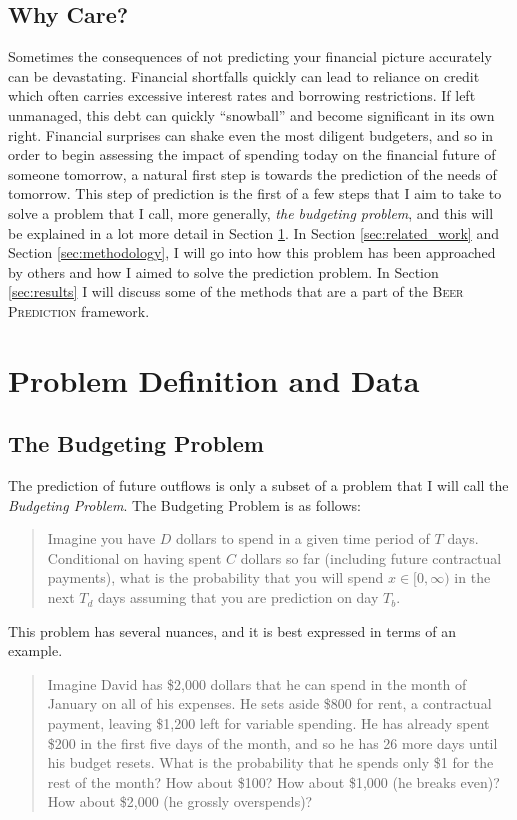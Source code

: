 \documentclass[11pt,a4paper]{article}
\newcommand{\beer}{\textsc{Beer Prediction}\xspace}
\begin{document}
\subsection{Why Care?}

Sometimes the consequences of not predicting your financial picture accurately can be devastating. Financial shortfalls quickly can lead to reliance on credit which often carries excessive interest rates and borrowing restrictions. If left unmanaged, this debt can quickly ``snowball'' and become significant in its own right. Financial surprises can shake even the most diligent budgeters, and so in order to begin assessing the impact of spending today on the financial future of someone tomorrow, a natural first step is towards the prediction of the needs of tomorrow. This step of prediction is the first of a few steps that I aim to take to solve a problem that I call, more generally, \textit{the budgeting problem}, and this will be explained in a lot more detail in Section \ref{sec:problem}. In Section \ref{sec:related_work} and Section \ref{sec:methodology}, I will go into how this problem has been approached by others and how I aimed to solve the prediction problem. In Section \ref{sec:results} I will discuss some of the methods that are a part of the \beer framework. 

\section{Problem Definition and Data} \label{sec:problem}

\subsection{The Budgeting Problem}
The prediction of future outflows is only a subset of a problem that I will call the \textit{Budgeting Problem}. The Budgeting Problem is as follows:
\begin{quote}
	Imagine you have $D$ dollars to spend in a given time period of $T$ days. Conditional on having spent $C$ dollars so far (including future contractual payments), what is the probability that you will spend $x \in [0,\infty)$ in the next $T_d$ days assuming that you are prediction on day $T_b$.  
\end{quote}
This problem has several nuances, and it is best expressed in terms of an example. 
\begin{quote}
	Imagine David has \$2,000 dollars that he can spend in the month of January on all of his expenses. He sets aside \$800 for rent, a contractual payment, leaving \$1,200 left for variable spending. He has already spent \$200 in the first five days of the month, and so he has 26 more days until his budget resets. What is the probability that he spends only \$1 for the rest of the month? How about \$100? How about \$1,000 (he breaks even)? How about \$2,000 (he grossly overspends)?
\end{quote}
\end{document}
